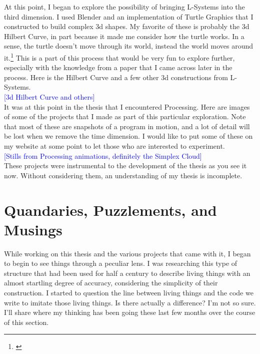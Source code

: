 \documentclass[12pt,twoside]{reedthesis}
\begin{document}
	At this point, I began to explore the possibility of bringing L-Systems into the third dimension. I used Blender and an implementation of Turtle Graphics that I constructed to build complex 3d shapes. My favorite of these is probably the 3d Hilbert Curve, in part because it made me consider how the turtle works. In a sense, the turtle doesn't move through its world, instead the world moves around it.\footnote{\cite{derose1989}} This is a part of this process that would be very fun to explore further, especially with the knowledge from a paper that I came across later in the process. Here is the Hilbert Curve and a few other 3d constructions from L-Systems.\\
	
	\textcolor{blue}{[3d Hilbert Curve and others]}\\
	
	It was at this point in the thesis that I encountered Processing. Here are images of some of the projects that I made as part of this particular exploration. Note that most of these are snapshots of a program in motion, and a lot of detail will be lost when we remove the time dimension. I would like to put some of these on my website at some point to let those who are interested to experiment.\\
	
	\textcolor{blue}{[Stills from Processing animations, definitely the Simplex Cloud]}\\
	
	These projects were instrumental to the development of the thesis as you see it now. Without considering them, an understanding of my thesis is incomplete.

\section{Quandaries, Puzzlements, and Musings}
\label{Questions}

	While working on this thesis and the various projects that came with it, I began to begin to see things through a peculiar lens. I was researching this type of structure that had been used for half a century to describe living things with an almost startling degree of accuracy, considering the simplicity of their construction. I started to question the line between living things and the code we write to imitate those living things. Is there actually a difference? I'm not so sure. I'll share where my thinking has been going these last few months over the course of this section.
	
\end{document}
